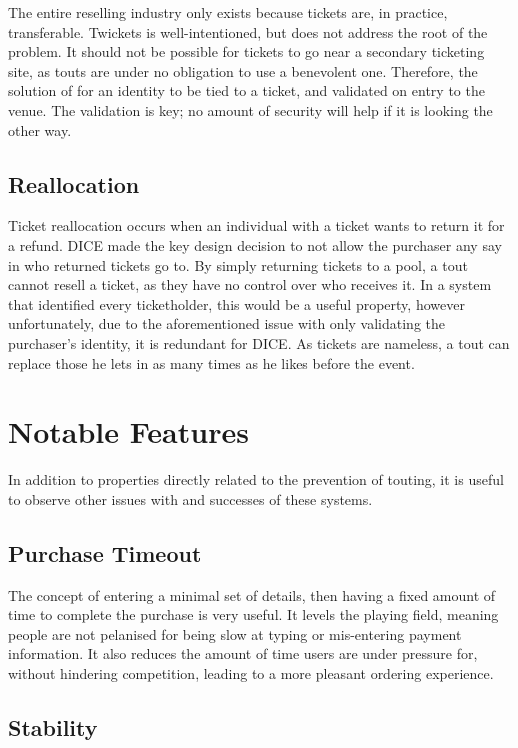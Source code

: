 \documentclass[12pt]{bhamdissertation}
\begin{document}
The entire reselling industry only exists because tickets are, in practice, transferable. Twickets is well-intentioned, but does not address the root of the problem. It should not be possible for tickets to go near a secondary ticketing site, as touts are under no obligation to use a benevolent one. Therefore, the solution of for an identity to be tied to a ticket, and validated on entry to the venue. The validation is key; no amount of security will help if it is looking the other way.

\subsection{Reallocation}

Ticket reallocation occurs when an individual with a ticket wants to return it for a refund. DICE made the key design decision to not allow the purchaser any say in who returned tickets go to. By simply returning tickets to a pool, a tout cannot resell a ticket, as they have no control over who receives it. In a system that identified every ticketholder, this would be a useful property, however unfortunately, due to the aforementioned issue with only validating the purchaser's identity, it is redundant for DICE. As tickets are nameless, a tout can replace those he lets in as many times as he likes before the event. 

\section{Notable Features}

In addition to properties directly related to the prevention of touting, it is useful to observe other issues with and successes of these systems.

\subsection{Purchase Timeout}

The concept of entering a minimal set of details, then having a fixed amount of time to complete the purchase is very useful. It levels the playing field, meaning people are not pelanised for being slow at typing or mis-entering payment information. It also reduces the amount of time users are under pressure for, without hindering competition, leading to a more pleasant ordering experience.

\subsection{Stability}
\end{document}
